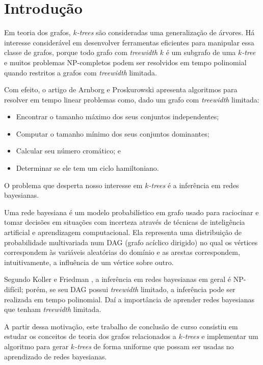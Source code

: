\chapter{Introdução}
\label{cap:introducao}

Em teoria dos grafos, \emph{$k$-trees} são consideradas uma generalização de árvores. Há interesse considerável em desenvolver ferramentas eficientes para manipular essa classe de grafos, porque todo grafo com \emph{treewidth} $k$ é um subgrafo de uma \emph{$k$-tree} e muitos problemas NP-completos podem ser resolvidos em tempo polinomial quando restritos a grafos com \emph{treewidth} limitada.

Com efeito, o artigo de Arnborg e Proskurowski \cite{arnborg} apresenta algoritmos para resolver em tempo linear problemas como, dado um grafo com \emph{treewidth} limitada:

\begin{itemize}
  \item Encontrar o tamanho máximo dos seus conjuntos independentes;
  \item Computar o tamanho mínimo dos seus conjuntos dominantes;
  \item Calcular seu número cromático; e
  \item Determinar se ele tem um ciclo hamiltoniano.
\end{itemize}

O problema que desperta nosso interesse em \emph{$k$-trees} é a inferência em redes bayesianas.

Uma rede bayesiana é um modelo probabilístico em grafo usado para raciocinar e tomar decisões em situações com incerteza através de técnicas de inteligência artificial e aprendizagem computacional. Ela representa uma distribuição de probabilidade multivariada num DAG (grafo acíclico dirigido) no qual os vértices correspondem às variáveis aleatórias do domínio e as arestas correspondem, intuitivamente, a influência de um vértice sobre outro.

Segundo Koller e Friedman \cite{koller}, a inferência em redes bayesianas em geral é NP-difícil; porém, se seu DAG possui \emph{treewidth} limitado, a inferência pode ser realizada em tempo polinomial. Daí a importância de aprender redes bayesianas que tenham \emph{treewidth} limitada.

A partir dessa motivação, este trabalho de conclusão de curso consistiu em estudar os conceitos de teoria dos grafos relacionados a \emph{$k$-trees} e implementar um algoritmo para gerar \emph{$k$-trees} de forma uniforme que possam ser usadas no aprendizado de redes bayesianas.

